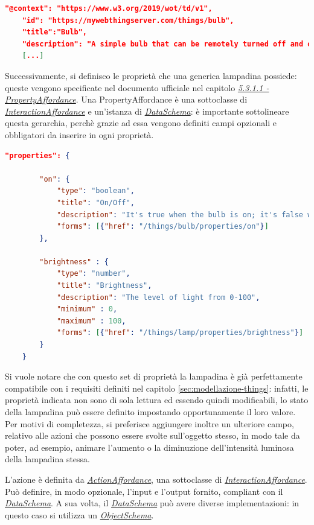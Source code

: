 \documentclass[12pt,a4paper,openright,oneside]{report}
\begin{document}
\begin{lstlisting}[language=json,caption={Inizio di una TD della lampadina},label=lst:start-td-lamp]
	"@context": "https://www.w3.org/2019/wot/td/v1",
	"id": "https://mywebthingserver.com/things/bulb",
	"title":"Bulb",
	"description": "A simple bulb that can be remotely turned off and on, with possibility to regulate its brightness.",
	[...]
\end{lstlisting}

Successivamente, si definisco le proprietà che una generica lampadina possiede: queste vengono specificate nel documento ufficiale nel capitolo \textit{\href{https://www.w3.org/TR/wot-thing-description/\#propertyaffordance}{5.3.1.1 - PropertyAffordance}}. Una PropertyAffordance è una sottoclasse di \textit{\href{https://www.w3.org/TR/wot-thing-description/\#interactionaffordance}{InteractionAffordance}} e un'istanza di \textit{\href{https://www.w3.org/TR/wot-thing-description/\#dataschema}{DataSchema}}: è importante sottolineare questa gerarchia, perchè grazie ad essa vengono definiti campi opzionali e obbligatori da inserire in ogni proprietà.

\clearpage
\begin{lstlisting}[language=json,caption={Proprietà di una lampadina},label=lst:start3-td-lamp]
	"properties": {
		
		"on": {
			"type": "boolean",
			"title": "On/Off",
			"description": "It's true when the bulb is on; it's false when turned off",
			"forms": [{"href": "/things/bulb/properties/on"}]
		},
		
		"brightness" : {
			"type": "number",
			"title": "Brightness",
			"description": "The level of light from 0-100",
			"minimum" : 0,
			"maximum" : 100,
			"forms": [{"href": "/things/lamp/properties/brightness"}]
		}
	}
\end{lstlisting}

Si vuole notare che con questo set di proprietà la lampadina è già perfettamente compatibile con i requisiti definiti nel capitolo \ref{sec:modellazione-things}: infatti, le proprietà indicata non sono di sola lettura ed essendo quindi modificabili, lo stato della lampadina può essere definito impostando opportunamente il loro valore. Per motivi di completezza, si preferisce aggiungere inoltre un ulteriore campo, relativo alle azioni che possono essere svolte sull'oggetto stesso, in modo tale da poter, ad esempio, animare l'aumento o la diminuzione dell'intensità luminosa della lampadina stessa. 

L'azione è definita da \textit{\href{https://www.w3.org/TR/wot-thing-description/\#actionaffordance}{ActionAffordance}}, una sottoclasse di \textit{\href{https://www.w3.org/TR/wot-thing-description/\#interactionaffordance}{InteractionAffordance}}. Può definire, in modo opzionale, l'input e l'output fornito, compliant con il \textit{\href{https://www.w3.org/TR/wot-thing-description/\#dataschema}{DataSchema}}. A sua volta, il \textit{\href{https://www.w3.org/TR/wot-thing-description/\#dataschema}{DataSchema}} può avere diverse implementazioni: in questo caso si utilizza un \textit{\href{https://www.w3.org/TR/wot-thing-description/\#objectschema}{ObjectSchema}}.
\end{document}
